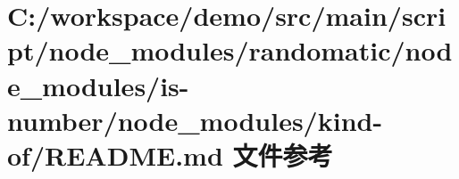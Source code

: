 \hypertarget{node__modules_2randomatic_2node__modules_2is-number_2node__modules_2kind-of_2_r_e_a_d_m_e_8md}{}\section{C\+:/workspace/demo/src/main/script/node\+\_\+modules/randomatic/node\+\_\+modules/is-\/number/node\+\_\+modules/kind-\/of/\+R\+E\+A\+D\+ME.md 文件参考}
\label{node__modules_2randomatic_2node__modules_2is-number_2node__modules_2kind-of_2_r_e_a_d_m_e_8md}
